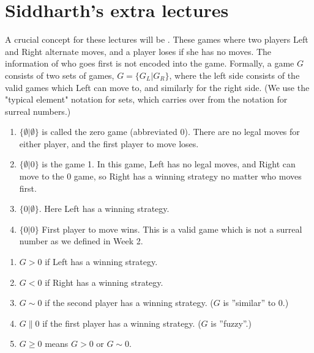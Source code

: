 \section{ Siddharth's extra lectures }

A crucial concept for these lectures will be . These games where two players Left and Right alternate moves, and a player loses if she has no moves. The information of who goes first is not encoded into the game. Formally, a game $G$ consists of two sets of games, $G=\{G_L|G_R\}$, where the left side consists of the valid games which Left can move to, and similarly for the right side. (We use the "typical element" notation for sets, which carries over from the notation for surreal numbers.)

\begin{example} %
\begin{enumerate}
  \item  $\{\emptyset|\emptyset\}$ is called the zero game (abbreviated 0). There are no legal moves for either player, and the first player to move loses.
  \item  $\{\emptyset|0\}$ is the game 1. In this game, Left has no legal moves, and Right can move to the 0 game, so Right has a winning strategy no matter who moves first.
  \item  $\{0|\emptyset\}$. Here Left has a winning strategy.
  \item  $\{0|0\}$ First player to move wins. This is a valid game which is not a surreal number as we defined in Week 2.
\end{enumerate}
\end{example}

\begin{definition} %
\begin{enumerate}
  \item  $G>0$ if Left has a winning strategy.
  \item  $G<0$ if Right has a winning strategy.
  \item  $G\sim 0$ if the second player has a winning strategy. ($G$ is ''similar'' to $0$.)
  \item  $G\parallel 0$ if the first player has a winning strategy. ($G$ is ''fuzzy''.)
  \item  $G\ge 0$ means $G>0$ or $G\sim 0$.
\end{enumerate}
 \end{definition}

